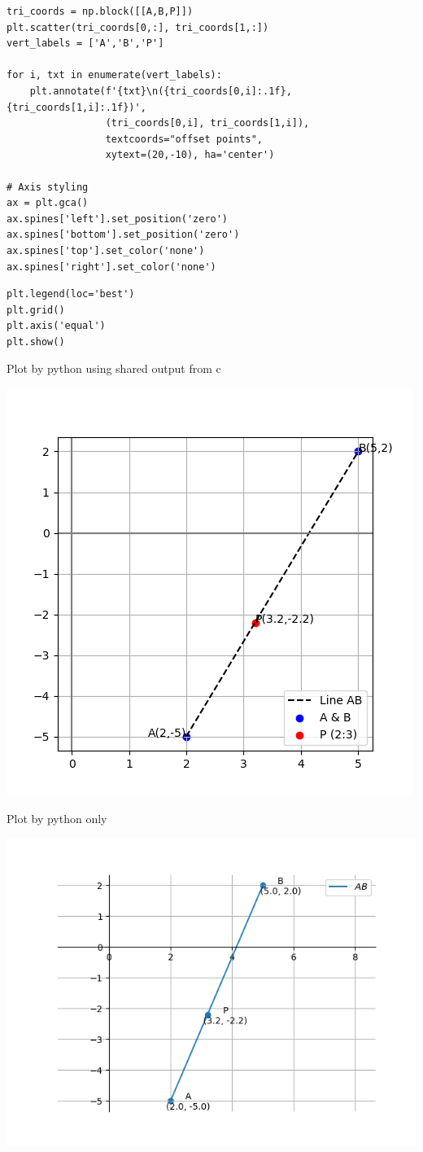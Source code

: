 \documentclass{beamer}
\begin{document}
\begin{frame}[fragile]

\begin{lstlisting}
tri_coords = np.block([[A,B,P]])
plt.scatter(tri_coords[0,:], tri_coords[1,:])
vert_labels = ['A','B','P']

for i, txt in enumerate(vert_labels):
    plt.annotate(f'{txt}\n({tri_coords[0,i]:.1f}, {tri_coords[1,i]:.1f})',
                 (tri_coords[0,i], tri_coords[1,i]),
                 textcoords="offset points",
                 xytext=(20,-10), ha='center')

# Axis styling
ax = plt.gca()
ax.spines['left'].set_position('zero')
ax.spines['bottom'].set_position('zero')
ax.spines['top'].set_color('none')
ax.spines['right'].set_color('none')
\end{lstlisting}
\end{frame}

\begin{frame}[fragile]

\begin{lstlisting}
plt.legend(loc='best')
plt.grid()
plt.axis('equal')
plt.show()
\end{lstlisting}
\end{frame}


\begin{frame}{Plot by python using shared output from c}
	\begin{center}
		\includegraphics[width=0.6\columnwidth]{figs/fig_1.png}
	\end{center}
\end{frame}

\begin{frame}{Plot by python only}
	\begin{center}
		\includegraphics[width=0.8\columnwidth]{figs/fig_2.png}
	\end{center}
\end{frame}
\end{document}
